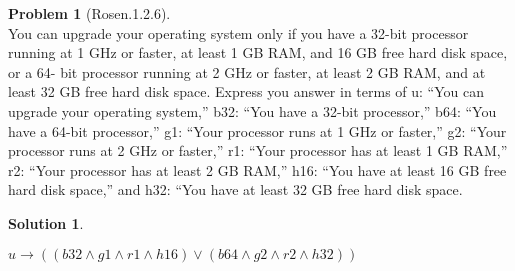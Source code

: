 \documentclass{article}
\theoremstyle{definition}
\newtheorem*{problem}{Problem}
\newtheorem*{solution}{Solution}
\begin{document}
\begin{problem}[Rosen.1.2.6]\ \\
You can upgrade your operating system only if you have
a 32-bit processor running at 1 GHz or faster, at least
1 GB RAM, and 16 GB free hard disk space, or a 64-
bit processor running at 2 GHz or faster, at least 2 GB
RAM, and at least 32 GB free hard disk space. Express
you answer in terms of u: “You can upgrade your operating
system,” b32: “You have a 32-bit processor,” b64:
“You have a 64-bit processor,” g1: “Your processor runs
at 1 GHz or faster,” g2: “Your processor runs at 2 GHz or
faster,” r1: “Your processor has at least 1 GB RAM,” r2:
“Your processor has at least 2 GB RAM,” h16: “You have
at least 16 GB free hard disk space,” and h32: “You have
at least 32 GB free hard disk space.
\begin{compactenum}
\renewcommand{\theenumi}{\alph{enumi}}

\end{compactenum}
\end{problem}

\begin{solution}\ \\
\begin{compactenum}
\renewcommand{\theenumi}{\alph{enumi}}
$u \rightarrow ((b32 \wedge g1 \wedge r1 \wedge h16) \vee (b64 \wedge g2 \wedge r2 \wedge h32)) $
\end{compactenum}
\end{solution}
\end{document}
